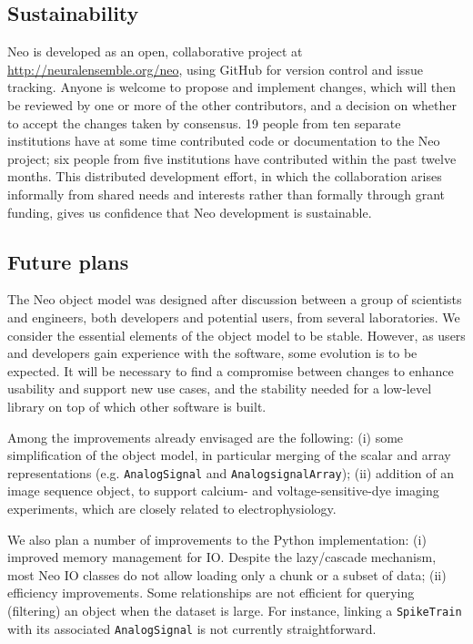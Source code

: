 \documentclass{frontiers}
\begin{document}
\subsection{Sustainability}

Neo is developed as an open, collaborative project at \url{http://neuralensemble.org/neo}, using GitHub for version control and issue tracking.
Anyone is welcome to propose and implement changes, which will then be reviewed by one or more of the other contributors, and a decision on whether to accept the changes taken by consensus.
19 people from ten separate institutions have at some time contributed code or documentation to the Neo project;  six people from five institutions have contributed within the past twelve months.
This distributed development effort, in which the collaboration arises informally from shared needs and interests rather than formally through grant funding, gives us confidence that Neo development is sustainable.


\subsection{Future plans}

The Neo object model was designed after discussion between a group of scientists and engineers, both developers and potential users, from several laboratories. 
We consider the essential elements of the object model to be stable. 
However, as users and developers gain experience with the software, some evolution is to be expected.
It will be necessary to find a compromise between changes to enhance usability and support new use cases, and the stability needed for a low-level library on top of which other software is built.

Among the improvements already envisaged are the following:
(i) some simplification of the object model, in particular merging of the scalar and array representations (e.g. \lstinline`AnalogSignal` and \lstinline`AnalogsignalArray`);
(ii) addition of an image sequence object, to support calcium- and voltage-sensitive-dye imaging experiments, which are closely related to electrophysiology.

We also plan a number of improvements to the Python implementation:
(i) improved memory management for IO. Despite the lazy/cascade mechanism, most Neo IO classes do not allow loading only a chunk or a subset of data;
(ii) efficiency improvements. Some relationships are not efficient for querying (filtering) an object when the dataset is large. For instance, linking a \lstinline`SpikeTrain` with its associated \lstinline`AnalogSignal` is not currently straightforward.
\end{document}
